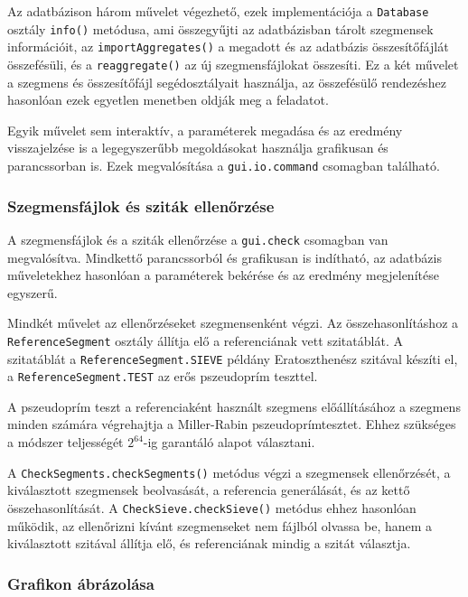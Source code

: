 Az adatbázison három művelet végezhető, ezek implementációja a \texttt{Database} osztály \texttt{info()} metódusa, ami összegyűjti az adatbázisban tárolt szegmensek információit, az \texttt{importAggregates()} a megadott és az adatbázis összesítőfájlát összefésüli, és a \texttt{reaggregate()} az új szegmensfájlokat összesíti.
Ez a két művelet a szegmens és összesítőfájl segédosztályait használja, az összefésülő rendezéshez hasonlóan ezek egyetlen menetben oldják meg a feladatot.

Egyik művelet sem interaktív, a paraméterek megadása és az eredmény visszajelzése is a legegyszerűbb megoldásokat használja grafikusan és parancssorban is.
Ezek megvalósítása a \texttt{gui.io.command} csomagban található.

\subsubsection{Szegmensfájlok és sziták ellenőrzése}

A szegmensfájlok és a sziták ellenőrzése a \texttt{gui.check} csomagban van megvalósítva.
Mindkettő parancssorból és grafikusan is indítható, az adatbázis műveletekhez hasonlóan a paraméterek bekérése és az eredmény megjelenítése egyszerű.

Mindkét művelet az ellenőrzéseket szegmensenként végzi.
Az összehasonlításhoz a \texttt{ReferenceSegment} osztály állítja elő a referenciának vett szitatáblát.
A szitatáblát a \texttt{ReferenceSegment.SIEVE} példány Eratoszthenész szitával készíti el, a \texttt{ReferenceSegment.TEST} az erős pszeudoprím teszttel.

A pszeudoprím teszt a referenciaként használt szegmens előállításához a szegmens minden számára végrehajtja a Miller-Rabin pszeudoprímtesztet.
Ehhez szükséges a módszer teljességét $2^{64}$-ig garantáló alapot választani\cite{pseudoprimebase}.

A \texttt{CheckSegments.checkSegments()} metódus végzi a szegmensek ellenőrzését, a kiválasztott szegmensek beolvasását, a referencia generálását, és az kettő összehasonlítását.
A \texttt{CheckSieve.checkSieve()} metódus ehhez hasonlóan működik, az ellenőrizni kívánt szegmenseket nem fájlból olvassa be, hanem a kiválasztott szitával állítja elő, és referenciának mindig a szitát választja.

\subsubsection{Grafikon ábrázolása}


